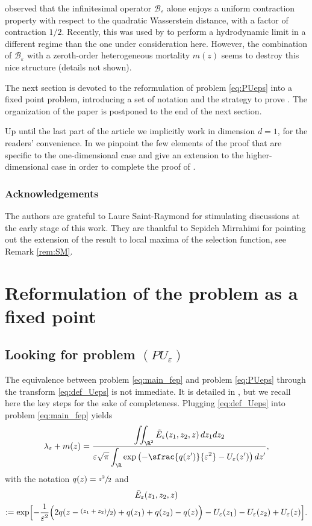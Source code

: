 \documentclass[JEP,XML,SOM,Unicode]{cedram}
\let\mathcal\mathscr
\newcommand{\psfrac}[2]{\sfrac{(#1)}{#2}}
\newcommand{\cB}{\mathcal{B}}
\theoremstyle{plain}
\theoremstyle{definition}
\let\eps\varepsilon
\begin{document}
\cite{raoulmirrahimiinfinitesimal} observed that the infinitesimal operator $\cB_\eps$ alone enjoys a uniform contraction property with respect to the quadratic Wasserstein distance, with a factor of contraction $1/2$. Recently, this was used by \cite{magal-raoul} to perform a hydrodynamic limit in a different regime than the one under consideration here. However, the combination of $\cB_\eps$ with a zeroth-order heterogeneous mortality $m(z)$ seems to destroy this nice structure (details not shown).

The next section is devoted to the reformulation of problem \eqref{eq:PUeps} into a fixed point problem, introducing a set of notation and the strategy to prove . The organization of the paper is postponed to the end of the next section.

Up until the last part of the article we implicitly work in dimension $d=1$, for the readers' convenience. In  we pinpoint the few elements of the proof that are specific to the one-dimensional case and give an extension to the higher-dimensional case in order to complete the proof of .

\subsubsection*{Acknowledgements} The authors are grateful to Laure Saint-Raymond for stimulating discussions at the early stage of this work. They are thankful to Sepideh Mirrahimi for pointing out the extension of the result to local maxima of the selection function, see Remark \ref{rem:SM}.

\section{Reformulation of the problem as a fixed point}\label{sec reformulation}
\subsection{Looking for problem $(PU_\eps)$}
\label{sec:reformulation1}
The equivalence between problem \eqref{eq:main_fep} and problem \eqref{eq:PUeps} through the transform \eqref{eq:def_Ueps} is not immediate. It is detailed in \cite{main}, but we recall here the key steps for the sake of completeness. Plugging \eqref{eq:def_Ueps} into problem \eqref{eq:main_fep} yields
\[
\lambda_\eps + m(z)
= \dfrac{\displaystyle \iint_{\R^2} \tilde{E}_\eps(z_1,z_2,z)\, d z_1 d z_2}{\displaystyle
\eps \sqrt{\pi} \int_\R \exp \left(-\sfrac{q(z')}{\eps^2} - U_\eps(z') \right) d z'},
\]
with the notation $q(z)=\sfrac{z^2}{2}$ and
\begin{multline*}
\tilde{E}_\eps(z_1,z_2,z)\\
:=\exp\Bigl[-\dfrac1{\eps^2} \Bigl(2 q(z-\psfrac{z_1+z_2}{2}) + q(z_1) + q(z_2) - q(z) \Bigr) - U_\eps(z_1) - U_\eps(z_2) + U_\eps(z) \Bigr].
\end{multline*}
\end{document}
